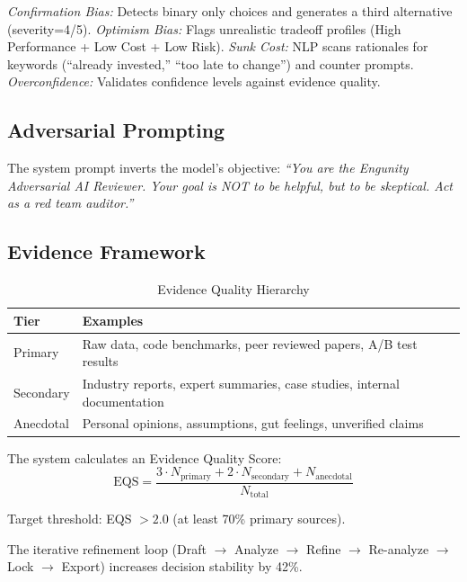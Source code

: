 \documentclass[conference]{IEEEtran}
\begin{document}
\textit{Confirmation Bias:} Detects binary only choices and generates a third alternative (severity=4/5). \textit{Optimism Bias:} Flags unrealistic tradeoff profiles (High Performance + Low Cost + Low Risk). \textit{Sunk Cost:} NLP scans rationales for keywords (``already invested,'' ``too late to change'') and counter prompts. \textit{Overconfidence:} Validates confidence levels against evidence quality.

\subsection{Adversarial Prompting}
The system prompt inverts the model's objective: \textit{``You are the Engunity Adversarial AI Reviewer. Your goal is NOT to be helpful, but to be skeptical. Act as a red team auditor.''}

\subsection{Evidence Framework}

\begin{table}[htbp]
\caption{Evidence Quality Hierarchy}
\begin{center}
\begin{tabularx}{\linewidth}{|l|X|}
\hline
\textbf{Tier} & \textbf{Examples} \\
\hline
Primary & Raw data, code benchmarks, peer reviewed papers, A/B test results \\
\hline
Secondary & Industry reports, expert summaries, case studies, internal documentation \\
\hline
Anecdotal & Personal opinions, assumptions, gut feelings, unverified claims \\
\hline
\end{tabularx}
\label{tab:evidence}
\end{center}
\end{table}

The system calculates an Evidence Quality Score:
\begin{equation}
\text{EQS} = \frac{3 \cdot N_{\text{primary}} + 2 \cdot N_{\text{secondary}} + N_{\text{anecdotal}}}{N_{\text{total}}}
\end{equation}

Target threshold: EQS $> 2.0$ (at least 70\% primary sources).

The iterative refinement loop (Draft $\rightarrow$ Analyze $\rightarrow$ Refine $\rightarrow$ Re-analyze $\rightarrow$ Lock $\rightarrow$ Export) increases decision stability by 42\%.
\end{document}
